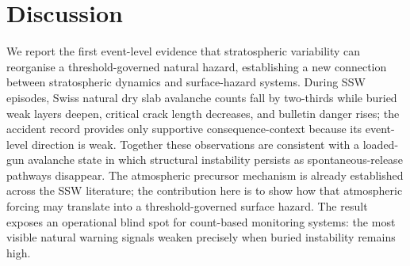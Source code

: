 \documentclass[11pt,letterpaper]{article}
\begin{document}
\section*{Discussion}

We report the first event-level evidence that stratospheric variability can reorganise a threshold-governed natural hazard, establishing a new connection between stratospheric dynamics and surface-hazard systems. During SSW episodes, Swiss natural dry slab avalanche counts fall by two-thirds while buried weak layers deepen, critical crack length decreases, and bulletin danger rises; the accident record provides only supportive consequence-context because its event-level direction is weak. Together these observations are consistent with a loaded-gun avalanche state in which structural instability persists as spontaneous-release pathways disappear. The atmospheric precursor mechanism is already established across the SSW literature\cite{Butler2017,Kidston2015,Baldwin2021}; the contribution here is to show how that atmospheric forcing may translate into a threshold-governed surface hazard. The result exposes an operational blind spot for count-based monitoring systems: the most visible natural warning signals weaken precisely when buried instability remains high.
\end{document}
